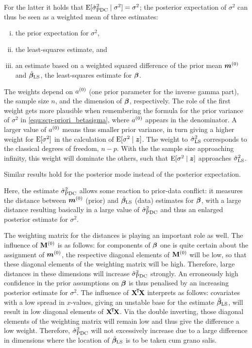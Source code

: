 For the latter it holds that $\operatorname{E}[\hat{\sigma}^2_\text{PDC}\mid\sigma^2] = \sigma^2$;
the posterior expectation of $\sigma^2$ can thus be seen
as a weighted mean of three estimates:
\begin{enumerate}[(i)]
\item the prior expectation for $\sigma^2$,
\item the least-squares estimate, and
\item an estimate based on a weighted squared difference of the prior mean ${\bm m}^{(0)}$ and $\hat{\boldsymbol{\beta}}_\text{LS}$,
the least-squares estimate for $\boldsymbol{\beta}$.
\end{enumerate}
%
The weights depend on $a^{(0)}$ (one prior parameter for the inverse gamma part),
the sample size $n$, and the dimension of $\boldsymbol{\beta}$, respectively.
The role of the first weight gets more plausible when remembering the formula for the prior variance of $\sigma^2$
in \eqref{equ:scp-priori_betasigma}, where $a^{(0)}$ appears in the denominator. A larger value of $a^{(0)}$ means
thus smaller prior variance, in turn giving a higher weight for $\operatorname{E}[\sigma^2]$
in the calculation of $\operatorname{E}[\sigma^2\mid {\bm z}]$.
The weight to $\hat{\sigma}^2_\text{LS}$ corresponds to the classical degrees of freedom, $n-p$. With the
the sample size approaching infinity, this weight will dominate the others, such that
$\operatorname{E}[\sigma^2\mid {\bm z}]$ approaches $\hat{\sigma}^2_\text{LS}$.%

Similar results hold for the posterior mode instead of the posterior expectation.

Here, the estimate $\hat{\sigma}^2_\text{PDC}$ allows some reaction to prior-data conflict:
it measures the distance between ${\bm m}^{(0)}$ (prior) and $\hat{\boldsymbol{\beta}}_\text{LS}$ (data)
estimates for $\boldsymbol{\beta}$, with a large distance resulting basically in a large value of $\hat{\sigma}^2_\text{PDC}$
and thus an enlarged posterior estimate for $\sigma^2$.

The weighting matrix for the distances is playing an important role as well.
%
The influence of $\mathbf{M}^{(0)}$ is as follows: for components of $\boldsymbol{\beta}$
one is quite certain about the assignment of ${\bm m}^{(0)}$, the respective diagonal elements
of $\mathbf{M}^{(0)}$ will be low, so that these diagonal elements of the weighting matrix
will be high. Therefore, large distances in these dimensions will increase $\hat{\sigma}^2_\text{PDC}$ strongly.
An erroneously high confidence in the prior assumptions on $\boldsymbol{\beta}$ is thus
penalised by an increasing posterior estimate for $\sigma^2$.
%
The influence of $\mathbf{X}^{{\mbox{\!\scriptsize\textsf{T}}}} \! \mathbf{X}$ interprets as follows: covariates with a low spread
in $x$-values, giving an unstable base for the estimate $\hat{\boldsymbol{\beta}}_\text{LS}$,
will result in low diagonal elements of $\mathbf{X}^{{\mbox{\!\scriptsize\textsf{T}}}} \! \mathbf{X}$.
Via the double inverting, those diagonal elements of the weighting matrix
will remain low and thus give the difference a low weight.
Therefore, $\hat{\sigma}^2_\text{PDC}$ will not excessively increase due to a large difference
in dimensions where the location of $\hat{\boldsymbol{\beta}}_\text{LS}$ is to be taken cum grano salis.

